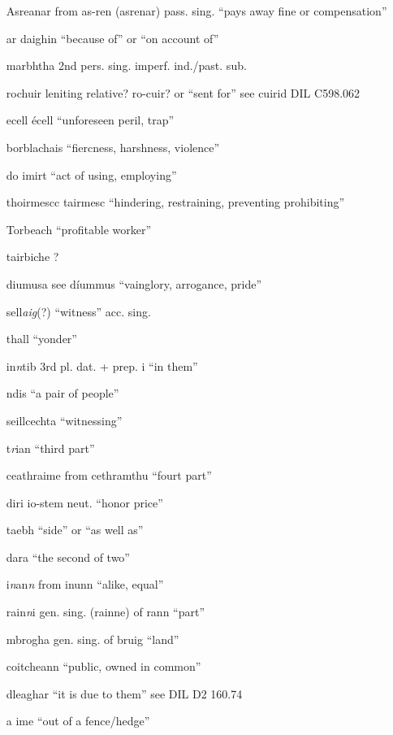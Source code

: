 \documentclass[11pt]{article}
\begin{document}
\begin{enumerate}
  \item[Asreanar] from as-ren (asrenar) pass. sing. \enquote{pays away fine or compensation}
  \item[ar daighin] \enquote{because of} or \enquote{on account of}
  \item[marbhtha] 2nd pers. sing. imperf. ind./past. sub.
  \item[rochuir] leniting relative? ro-cuir? or \enquote{sent for} see cuirid DIL C598.062
  \item[ecell] \'{e}cell \enquote{unforeseen peril, trap}
  \item[borblachais] \enquote{fiercness, harshness, violence}
  \item[do imirt] \enquote{act of using, employing}
  \item[thoirmescc] tairmesc \enquote{hindering, restraining, preventing prohibiting}
  \item[Torbeach] \enquote{profitable worker}
  \item[tairbiche] ? 
  \item[diumusa] see d\'{i}ummus \enquote{vainglory, arrogance, pride}
  \item[sell\emph{aig}(?)] \enquote{witness} acc. sing.
  \item[thall] \enquote{yonder}
  \item[in\emph{n}tib] 3rd pl. dat. + prep. i \enquote{in them}
  \item[ndis] \enquote{a pair of people}
  \item[seillcechta] \enquote{witnessing}
  \item[t\emph{r}ian] \enquote{third part}
  \item[ceathraime] from cethramthu \enquote{fourt part}
  \item[diri] io-stem neut. \enquote{honor price}
  \item[taebh] \enquote{side} or \enquote{as well as}
  \item[dara] \enquote{the second of two}
  \item[i\emph{n}an\emph{n}] from inunn \enquote{alike, equal}
  \item[rain\emph{n}i] gen. sing. (rainne) of rann \enquote{part}
  \item[mbrogha] gen. sing. of bruig \enquote{land}
  \item[coitcheann] \enquote{public, owned in common} 
  \item[dleaghar] \enquote{it is due to them} see DIL D2 160.74 
  \item[a ime] \enquote{out of a fence/hedge}

\end{enumerate}
\end{document}
